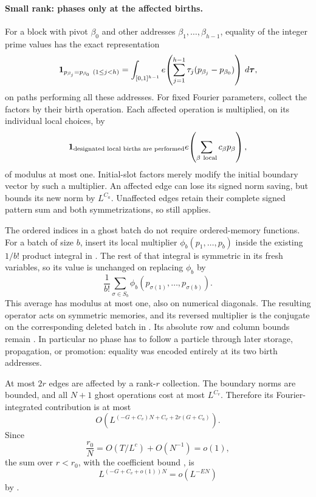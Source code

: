 \paragraph{Small rank: phases only at the affected births.}
For a block with pivot $\beta_0$ and other addresses
$\beta_1,\ldots,\beta_{h-1}$, equality of the integer
prime values has the exact representation
\begin{equation}\label{eq:birth-equality-fourier}
 \mathbf 1_{p_{\beta_j}=p_{\beta_0}\ (1\le j<h)}
 =\int_{[0,1]^{h-1}}
 e\!\left(\sum_{j=1}^{h-1}\tau_j(p_{\beta_j}-p_{\beta_0})\right)
             \,d\boldsymbol\tau,
\end{equation}
on paths performing all these addresses.  For fixed
Fourier parameters, collect the factors by their birth
operation.  Each affected operation is multiplied,
on its individual local choices, by
\[
 \mathbf 1_{\text{designated local births are performed}}
       e\!\left(\sum_{\beta\ \text{local}}c_\beta p_\beta\right),
\]
of modulus at most one.  Initial-slot factors merely
modify the initial boundary vector by such a multiplier.
An affected edge can lose its signed norm saving, but
 bounds its new norm by
$L^{C_a}$.  Unaffected edges retain their complete signed
pattern sum and both symmetrizations, so
 still applies.

The ordered indices in a ghost batch do not require
ordered-memory functions.  For a batch of size $b$, insert
its local multiplier $\phi_b(p_1,\ldots,p_b)$ inside
the existing $1/b!$ product integral in
.  The rest of that integral is
symmetric in its fresh variables, so its value is
unchanged on replacing $\phi_b$ by
\[
 \frac1{b!}\sum_{\sigma\in S_b}
       \phi_b(p_{\sigma(1)},\ldots,p_{\sigma(b)}).
\]
This average has modulus at most one, also on numerical
diagonals.  The resulting operator acts on symmetric
memories, and its reversed multiplier is the conjugate
on the corresponding deleted batch in
.  Its absolute row and
column bounds remain .
In particular no phase has to follow a particle through
later storage, propagation, or promotion: equality was
encoded entirely at its two birth addresses.

At most $2r$ edges are affected by a rank-$r$ collection.
The boundary norms are bounded, and all $N+1$ ghost
operations cost at most $L^{C_v}$.  Therefore its
Fourier-integrated contribution is at most
\begin{equation}\label{eq:low-rank-path-bound}
 O\left(L^{(-G+C_v)N+C_v+2r(G+C_a)}\right).
\end{equation}
Since
\[
 \frac{r_0}{N}=O(T/L^c)+O(N^{-1})=o(1),
\]
the sum over $r<r_0$, with the coefficient bound
, is
\[
 L^{(-G+C_v+o(1))N}=o(L^{-EN})
\]
by .

